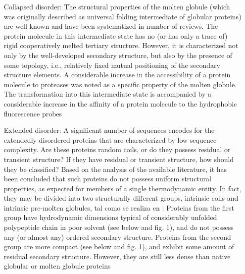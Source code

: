 \begin{itemize}
 \item[Collapsed disorder: ] The structural properties of the molten globule (which was originally described as universal folding intermediate of globular proteins) are well known and
have been systematized in number of reviews. The protein molecule in this intermediate state has no (or has only a trace of) rigid cooperatively melted tertiary structure. However, it is characterized not only by the well-developed secondary structure, but also by the presence of some topology, i.e., relatively fixed mutual positioning of the secondary structure elements. A considerable increase in the accessibility of a protein molecule to proteases was noted as a specific property of the molten globule.
The transformation into this intermediate state is accompanied by a considerable increase in the affinity of a protein molecule to the hydrophobic fluorescence probes

 \item[Extended disorder: ] A significant number of sequences encodes for the extendedly disordered proteins that are characterized by low sequence complexity. Are these proteins
random coils, or do they possess residual or transient structure? If they have residual or transient structure, how should they be classified? Based on the analysis of the available literature, it has been concluded that such proteins do not possess uniform structural properties, as expected for members of a single thermodynamic entity.
In fact, they may be divided into two structurally different groups, intrinsic coils and intrinsic pre-molten globules, tal como se realiza en \cite{uversky2002natively}: 
 Proteins from the first group have hydrodynamic dimensions typical of considerably unfolded polypeptide chain in poor solvent (see below and fig. 1), and do not possess any (or almost any) ordered secondary structure. 
Proteins from the second group are more compact (see below and fig. 1), and exhibit some amount of residual secondary structure. However, they are still less dense than native globular or molten globule proteins
\end{itemize}





